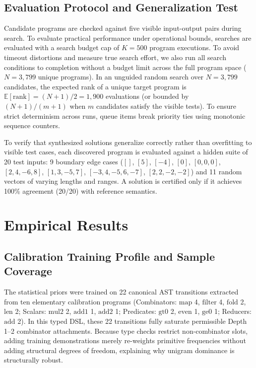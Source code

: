 \documentclass[10pt,twocolumn]{article}
\begin{document}
\subsection{Evaluation Protocol and Generalization Test}
Candidate programs are checked against five visible input-output pairs during search. To evaluate practical performance under operational bounds, searches are evaluated with a search budget cap of $K = 500$ program executions. To avoid timeout distortions and measure true search effort, we also run all search conditions to completion without a budget limit across the full program space ($N = 3,799$ unique programs). In an unguided random search over $N = 3,799$ candidates, the expected rank of a unique target program is $\mathbb{E}[\text{rank}] = (N+1)/2 = 1,900$ evaluations (or bounded by $(N+1)/(m+1)$ when $m$ candidates satisfy the visible tests). To ensure strict determinism across runs, queue items break priority ties using monotonic sequence counters.

To verify that synthesized solutions generalize correctly rather than overfitting to visible test cases, each discovered program is evaluated against a hidden suite of 20 test inputs: 9 boundary edge cases ($[]$, $[5]$, $[-4]$, $[0]$, $[0, 0, 0]$, $[2, 4, -6, 8]$, $[1, 3, -5, 7]$, $[-3, 4, -5, 6, -7]$, $[2, 2, -2, -2]$) and 11 random vectors of varying lengths and ranges. A solution is certified only if it achieves 100\% agreement (20/20) with reference semantics.

\section{Empirical Results}

\subsection{Calibration Training Profile and Sample Coverage}
The statistical priors were trained on 22 canonical AST transitions extracted from ten elementary calibration programs (Combinators: $\text{map}$ 4, $\text{filter}$ 4, $\text{fold}$ 2, $\text{len}$ 2; Scalars: $\text{mul2}$ 2, $\text{add1}$ 1, $\text{add2}$ 1; Predicates: $\text{gt0}$ 2, $\text{even}$ 1, $\text{ge0}$ 1; Reducers: $\text{add}$ 2). In this typed DSL, these 22 transitions fully saturate permissible Depth 1--2 combinator attachments. Because type checks restrict non-combinator slots, adding training demonstrations merely re-weights primitive frequencies without adding structural degrees of freedom, explaining why unigram dominance is structurally robust.
\end{document}
